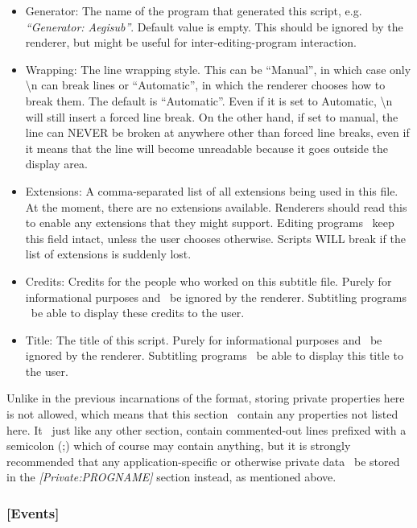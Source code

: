 \documentclass{spec}
\begin{document}
\begin{itemize}
\item Generator: The name of the program that generated this script, e.g. \textit{``Generator: Aegisub''}.
Default value is empty. This should be ignored by the renderer, but might be useful for inter-editing-program
interaction.
\item Wrapping: The line wrapping style. This can be ``Manual'', in which case only \textbackslash{n} can
break lines or ``Automatic'', in which the renderer chooses how to break them. The default is ``Automatic''.
Even if it is set to Automatic, \textbackslash{n} will still insert a forced line break.
On the other hand, if set to manual, the line can NEVER be broken at anywhere other than forced line breaks,
even if it means that the line will become unreadable because it goes outside the display area.
\item Extensions: A comma-separated list of all extensions being used in this file. At the moment, there are
no extensions available. Renderers should read this to enable any extensions that they might support.
Editing programs \must\ keep this field intact, unless the user chooses otherwise. Scripts WILL break
if the list of extensions is suddenly lost.
\item Credits: Credits for the people who worked on this subtitle file. Purely for informational purposes and
\should\ be ignored by the renderer. Subtitling programs \should\ be able to display these credits to the user.
\item Title: The title of this script. Purely for informational purposes and \should\ be ignored by the renderer.
Subtitling programs \should\ be able to display this title to the user.
\end{itemize}

Unlike in the previous incarnations of the format, storing private properties here is not allowed, which means
that this section \mustnot\ contain any properties not listed here. It \may\, just like any other section, contain
commented-out lines prefixed with a semicolon (;) which of course may contain anything, but it is strongly recommended
that any application-specific or otherwise private data \should\ be stored in the \textit{[Private:PROGNAME]}
section instead, as mentioned above.


\subsubsection{[Events]}
\end{document}
